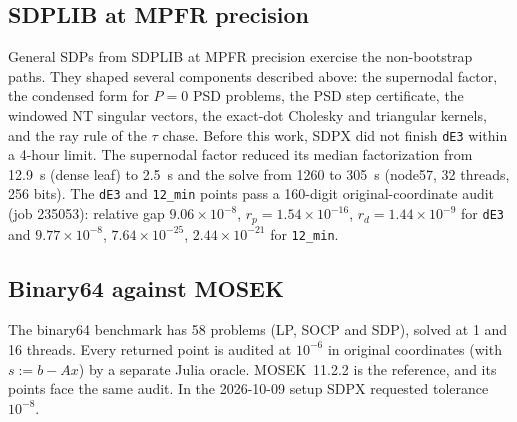 \documentclass[11pt]{article}
\newcommand{\code}[1]{\texttt{#1}}
\begin{document}
\subsection{SDPLIB at MPFR precision}

General SDPs from SDPLIB \cite{Borchers1999} at MPFR precision exercise the
non-bootstrap paths. They shaped several components described above: the
supernodal factor, the condensed form for $P=0$ PSD problems, the PSD step
certificate, the windowed NT singular vectors, the exact-dot Cholesky and
triangular kernels, and the ray rule of the $\tau$ chase. Before this work,
SDPX did not finish \code{dE3} within a 4-hour limit. The supernodal factor
reduced its median factorization from 12.9~s (dense leaf) to 2.5~s and the
solve from 1260 to 305~s (node57, 32 threads, 256 bits). The \code{dE3} and
\code{12\_min} points pass a 160-digit original-coordinate audit (job 235053):
relative gap $9.06\times10^{-8}$, $r_p = 1.54\times10^{-16}$,
$r_d=1.44\times10^{-9}$ for \code{dE3} and $9.77\times10^{-8}$,
$7.64\times10^{-25}$, $2.44\times10^{-21}$ for \code{12\_min}.

\subsection{Binary64 against MOSEK}

The binary64 benchmark has 58 problems (LP, SOCP and SDP), solved at 1 and 16
threads. Every returned point is audited at $10^{-6}$ in original coordinates
(with $s := b - Ax$) by a separate Julia oracle. MOSEK~11.2.2 \cite{MOSEK} is
the reference, and its points face the same audit. In the 2026-10-09 setup
SDPX requested tolerance $10^{-8}$.
\end{document}
